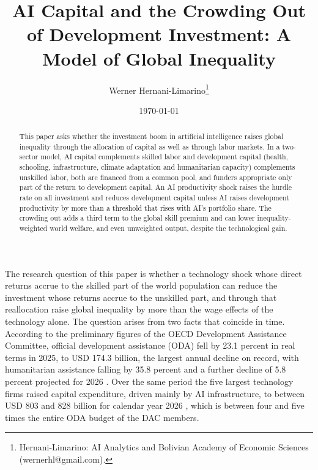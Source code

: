 \documentclass[AER]{AEA}
\begin{document}
\title{AI Capital and the Crowding Out of Development Investment: A Model of Global Inequality}
\author{Werner Hernani-Limarino\thanks{Hernani-Limarino: AI Analytics and Bolivian Academy of Economic Sciences (wernerhl@gmail.com).}}
\date{\today}

\begin{abstract}
This paper asks whether the investment boom in artificial intelligence raises global inequality through the allocation of capital as well as through labor markets. In a two-sector model, AI capital complements skilled labor and development capital (health, schooling, infrastructure, climate adaptation and humanitarian capacity) complements unskilled labor, both are financed from a common pool, and funders appropriate only part of the return to development capital. An AI productivity shock raises the hurdle rate on all investment and reduces development capital unless AI raises development productivity by more than a threshold that rises with AI's portfolio share. The crowding out adds a third term to the global skill premium and can lower inequality-weighted world welfare, and even unweighted output, despite the technological gain.
\end{abstract}

\maketitle

The research question of this paper is whether a technology shock whose direct returns accrue to the skilled part of the world population can reduce the investment whose returns accrue to the unskilled part, and through that reallocation raise global inequality by more than the wage effects of the technology alone. The question arises from two facts that coincide in time. According to the preliminary figures of the OECD Development Assistance Committee, official development assistance (ODA) fell by 23.1 percent in real terms in 2025, to USD 174.3 billion, the largest annual decline on record, with humanitarian assistance falling by 35.8 percent and a further decline of 5.8 percent projected for 2026 \citep{OECD2026ODA}. Over the same period the five largest technology firms raised capital expenditure, driven mainly by AI infrastructure, to between USD 803 and 828 billion for calendar year 2026 \citep{BI2026capex}, which is between four and five times the entire ODA budget of the DAC members.
\end{document}
